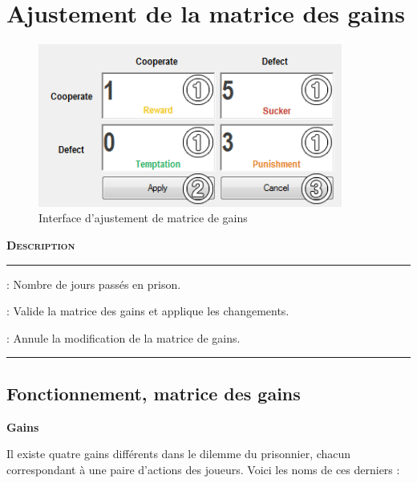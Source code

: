 \documentclass[a4paper, french]{article}
\newcommand*\circled[1]{\tikz[baseline=(char.base)]{
                \node[shape=circle,thick,draw,inner sep=2pt] (char) {\textbf{#1}};}
            }
\begin{document}
\section{Ajustement de la matrice des gains}
\begin{figure}[htp]
    \centering
    \includegraphics[width=10cm]{payoffmatrix_view.png}
    \caption{Interface d'ajustement de matrice de gains}
\end{figure}

\vspace{0.25cm}
\begin{description}[labelwidth=3cm]
    \small
    \item[\textbf{\textsc{Nom}}] \textbf{\textsc{Description}}
    \vspace{0.1cm}
    \hrule{}
    \item[\texttt{\circled{1} Gains}] : Nombre de jours passés en prison. 
    \item[\texttt{\circled{2} Appliquer}] : Valide la matrice des gains et applique les changements.
    \item[\texttt{\circled{3} Annuler}] : Annule la modification de la matrice de gains.
\end{description}
\hrule{}
\vspace{0.5cm}

\subsection{Fonctionnement, matrice des gains}
\textbf{\circled{1} Gains}

Il existe quatre gains différents dans le dilemme du prisonnier, chacun correspondant à une paire d'actions des joueurs. Voici les noms de ces derniers :
\end{document}
